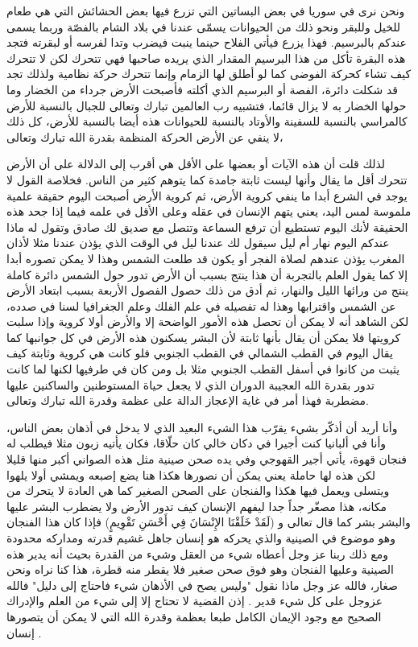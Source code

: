 ونحن نرى في سوريا في بعض البساتين التي تزرع فيها بعض الحشائش التي هي طعام للخيل وللبقر ونحو ذلك من الحيوانات يسمّى عندنا في بلاد الشام بالفصّة وربما يسمى عندكم بالبرسيم. فهذا يزرع فيأتي الفلاح حينما ينبت فيضرب وتدا لفرسه أو لبقرته فتجد هذه البقرة تأكل من هذا البرسيم المقدار الذي يريده صاحبها فهي تتحرك لكن لا تتحرك كيف تشاء كحركة الفوضى كما لو أطلق لها الزمام وإنما تتحرك حركة نظامية ولذلك تجد قد شكلت دائرة، الفصة أو البرسيم الذي أكلته فأصبحت الأرض جرداء من الخضار وما حولها الخضار به لا يزال قائما، فتشبيه رب العالمين تبارك وتعالى للجبال بالنسبة للأرض كالمراسي بالنسبة للسفينة والأوتاد بالنسبة للحيوانات هذه أيضا بالنسبة للأرض، كل ذلك لا ينفي عن الأرض الحركة المنظمة بقدرة الله تبارك وتعالى، 

لذلك قلت أن هذه الآيات أو بعضها على الأقل هي أقرب إلى الدلالة على أن الأرض تتحرك أقل ما يقال وأنها ليست ثابتة جامدة كما يتوهم كثير من الناس.
فخلاصة القول لا يوجد في الشرع أبدا ما ينفي كروية الأرض، ثم كروية الأرض أصبحت اليوم حقيقة علمية ملموسة لمس اليد، يعني يتهم الإنسان في عقله وعلى الأقل في علمه فيما إذا جحد هذه الحقيقة لأنك اليوم تستطيع أن ترفع السماعة وتتصل مع صديق لك صادق وتقول له ماذا عندكم اليوم نهار أم ليل سيقول لك عندنا ليل في الوقت الذي يؤذن عندنا مثلا لأذان المغرب يؤذن عندهم لصلاة الفجر أو يكون قد طلعت الشمس وهذا لا يمكن تصوره أبدا إلا كما يقول العلم بالتجربة أن هذا ينتج بسبب أن الأرض تدور حول الشمس دائرة كاملة ينتج من ورائها الليل والنهار، ثم أدق من ذلك حصول الفصول الأربعة بسبب ابتعاد الأرض عن الشمس واقترابها وهذا له تفصيله في علم الفلك وعلم الجغرافيا لسنا في صدده، لكن الشاهد أنه لا يمكن أن تحصل هذه الأمور الواضحة إلا والأرض أولا كروية وإذا سلبت كرويتها فلا يمكن أن يقال بأنها ثابتة لأن البشر يسكنون هذه الأرض في كل جوانبها كما يقال اليوم في القطب الشمالي في القطب الجنوبي فلو كانت هي كروية وثابتة كيف يثبت من كانوا في أسفل القطب الجنوبي مثلا بل ومن كان في طرفيها لكنها لما كانت تدور بقدرة الله العجيبة الدوران الذي لا يجعل حياة المستوطنين والساكنين عليها مضطربة فهذا أمر في غاية الإعجاز الدالة على عظمة وقدرة الله تبارك وتعالى.

وأنا أريد أن أذكّر بشيء يقرّب هذا الشيء البعيد الذي لا يدخل في أذهان بعض الناس، وأنا في ألبانيا كنت أجيرا في دكان خالي كان حلّاقا، فكان يأتيه زبون مثلا فيطلب له فنجان قهوة، يأتي أجير القهوجي وفي يده صحن صينية مثل هذه الصواني أكبر منها قليلا لكن هذه لها حاملة يعني يمكن أن نصورها هكذا هنا يضع إصبعه ويمشي أولا يلهوا ويتسلى ويعمل فيها هكذا والفنجان على الصحن الصغير كما هي العادة لا يتحرك من مكانه، هذا مصغّر جداً جدا ليفهم الإنسان كيف تدور الأرض ولا يضطرب البشر عليها والبشر بشر كما قال تعالى و (لَقَدْ خَلَقْنَا الإِنْسَانَ فِي أَحْسَنِ تَقْوِيمٍ) فإذا كان هذا الفنجان وهو موضوع في الصينية والذي يحركه هو إنسان جاهل غشيم قدرته ومداركه محدودة ومع ذلك ربنا عز وجل أعطاه شيء من العقل وشيء من القدرة بحيث أنه يدير هذه الصينية وعليها الفنجان وهو فوق صحن صغير فلا يقطر منه قطرة، هذا كنا نراه ونحن صغار، فالله عز وجل ماذا نقول "وليس يصح في الأذهان شيء فاحتاج إلى دليل" فالله عزوجل على كل شيء قدير .
إذن القضية لا تحتاج إلا إلى شيء من العلم والإدراك الصحيح مع وجود الإيمان الكامل طبعا بعظمة وقدرة الله التي لا يمكن أن يتصورها إنسان \href{https://alathar.net/home/esound/index.php?op=codevi&coid=155590}{\faExternalLink} \href{https://shamela.ws/book/36190/3337#p8}{\faExternalLink}.


